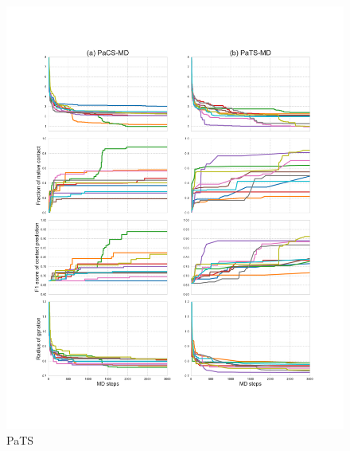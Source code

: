\begin{figure}[ht]
\begin{minipage}[b]{0.49\textwidth}
\includegraphics[width=1.0\textwidth]{Figures/trp_plot_both.pdf}
\caption{PaTS}
\label{fig:result_pats_plot}
\end{minipage}
\end{figure}


